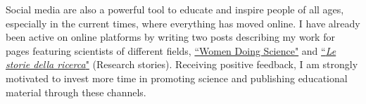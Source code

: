 {\begin{flushleft}
Social media are also a powerful tool to educate and inspire people of all ages, especially in the current times, where everything has moved online.
I have already been active on online platforms by writing two posts describing my work for pages featuring scientists of different fields, \href{https://www.instagram.com/p/CEcnln7DIN-/}{``Women Doing Science"} and \href{https://www.instagram.com/p/B-HEgJEDnBm/}{``{\em Le storie della ricerca}"} (Research stories). Receiving positive feedback, I am strongly motivated to invest more time in promoting science and publishing educational material through these channels.
\end{flushleft}
}
